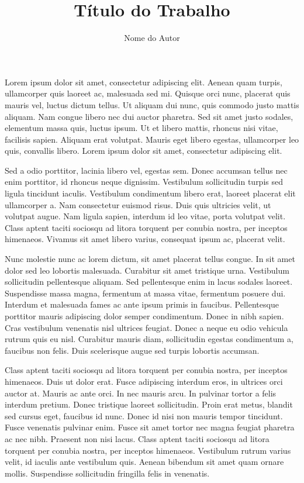 \documentclass[rascunho]{fei}
\author{Nome do Autor}
\title{Título do Trabalho}
\begin{document}

Lorem ipsum dolor sit amet, consectetur adipiscing elit. Aenean quam turpis, ullamcorper quis laoreet ac, malesuada sed mi. Quisque orci nunc, placerat quis mauris vel, luctus dictum tellus. Ut aliquam dui nunc, quis commodo justo mattis aliquam. Nam congue libero nec dui auctor pharetra. Sed sit amet justo sodales, elementum massa quis, luctus ipsum. Ut et libero mattis, rhoncus nisi vitae, facilisis sapien. Aliquam erat volutpat. Mauris eget libero egestas, ullamcorper leo quis, convallis libero. Lorem ipsum dolor sit amet, consectetur adipiscing elit.

Sed a odio porttitor, lacinia libero vel, egestas sem. Donec accumsan tellus nec enim porttitor, id rhoncus neque dignissim. Vestibulum sollicitudin turpis sed ligula tincidunt iaculis. Vestibulum condimentum libero erat, laoreet placerat elit ullamcorper a. Nam consectetur euismod risus. Duis quis ultricies velit, ut volutpat augue. Nam ligula sapien, interdum id leo vitae, porta volutpat velit. Class aptent taciti sociosqu ad litora torquent per conubia nostra, per inceptos himenaeos. Vivamus sit amet libero varius, consequat ipsum ac, placerat velit.

Nunc molestie nunc ac lorem dictum, sit amet placerat tellus congue. In sit amet dolor sed leo lobortis malesuada. Curabitur sit amet tristique urna. Vestibulum sollicitudin pellentesque aliquam. Sed pellentesque enim in lacus sodales laoreet. Suspendisse massa magna, fermentum at massa vitae, fermentum posuere dui. Interdum et malesuada fames ac ante ipsum primis in faucibus. Pellentesque porttitor mauris adipiscing dolor semper condimentum. Donec in nibh sapien. Cras vestibulum venenatis nisl ultrices feugiat. Donec a neque eu odio vehicula rutrum quis eu nisl. Curabitur mauris diam, sollicitudin egestas condimentum a, faucibus non felis. Duis scelerisque augue sed turpis lobortis accumsan.

Class aptent taciti sociosqu ad litora torquent per conubia nostra, per inceptos himenaeos. Duis ut dolor erat. Fusce adipiscing interdum eros, in ultrices orci auctor at. Mauris ac ante orci. In nec mauris arcu. In pulvinar tortor a felis interdum pretium. Donec tristique laoreet sollicitudin. Proin erat metus, blandit sed cursus eget, faucibus id nunc. Donec id nisi non mauris tempor tincidunt. Fusce venenatis pulvinar enim. Fusce sit amet tortor nec magna feugiat pharetra ac nec nibh. Praesent non nisi lacus. Class aptent taciti sociosqu ad litora torquent per conubia nostra, per inceptos himenaeos. Vestibulum rutrum varius velit, id iaculis ante vestibulum quis. Aenean bibendum sit amet quam ornare mollis. Suspendisse sollicitudin fringilla felis in venenatis.
\end{document}

